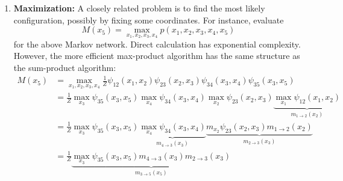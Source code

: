 \documentclass[11pt,a4paper]{article}
\begin{document}
\begin{enumerate}
    \item \textbf{Maximization:} A closely related problem is to find the most likely configuration, possibly by fixing some coordinates. For instance, evaluate
    $$
    M\left(x_5\right)=\max _{x_1, x_2, x_3, x_4} p\left(x_1, x_2, x_3, x_4, x_5\right)
    $$
    for the above Markov network. Direct calculation has exponential complexity. However, the more efficient max-product algorithm has the same structure as the sum-product algorithm:
    \begin{equation}
        \begin{aligned}
            M\left(x_5\right)&=\max _{x_1, x_2, x_3, x_4} \frac{1}{Z} \psi_{12}\left(x_1, x_2\right) \psi_{23}\left(x_2, x_3\right) \psi_{34}\left(x_3, x_4\right) \psi_{35}\left(x_3, x_5\right)\\
            &=\frac{1}{Z} \max _{x_3} \psi_{35}\left(x_3, x_5\right) \max _{x_4} \psi_{34}\left(x_3, x_4\right) \max _{x_2} \psi_{23}\left(x_2, x_3\right) \underbrace{\max _{x_1} \psi_{12}\left(x_1, x_2\right)}_{m_{1 \rightarrow 2}\left(x_2\right)}\\
            &=\frac{1}{Z} \max _{x_3} \psi_{35}\left(x_3, x_5\right) \underbrace{\max _{x_4} \psi_{34}\left(x_3, x_4\right)}_{m_{4 \rightarrow 3}\left(x_3\right)} \underbrace{m_{x_2} \psi_{23}\left(x_2, x_3\right) m_{1 \rightarrow 2}\left(x_2\right)}_{m_{2 \rightarrow 3}\left(x_3\right)}\\
            &=\frac{1}{Z} \underbrace{\max _{x_3} \psi_{35}\left(x_3, x_5\right) m_{4 \rightarrow 3}\left(x_3\right) m_{2 \rightarrow 3}\left(x_3\right)}_{m_{3 \rightarrow 5}\left(x_5\right)}
        \end{aligned}
        \nonumber
    \end{equation}
\end{enumerate}
\end{document}
